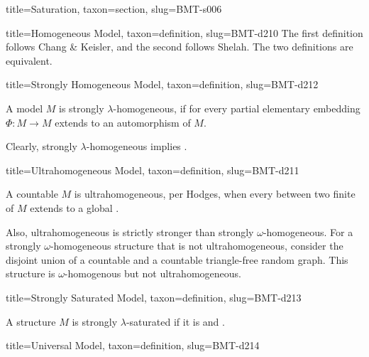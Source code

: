 \documentclass[a4paper]{article}
\begin{document}
\begin{tree}{title={Saturation}, taxon={section}, slug={BMT-s006}}
\begin{tree}{title={Homogeneous Model}, taxon={definition}, slug={BMT-d210}}
    The first definition follows Chang & Keisler, and the second follows Shelah. The two definitions are equivalent.

\end{tree}

\begin{tree}{title={Strongly Homogeneous Model}, taxon={definition}, slug={BMT-d212}}

    A model \(M\) is strongly \(\lambda\)-homogeneous, if for every partial elementary embedding \(\Phi :M \to  M\) extends to an automorphism of \(M\). 

    Clearly, strongly \(\lambda\)-homogeneous implies . 

\end{tree}

\begin{tree}{title={Ultrahomogeneous Model}, taxon={definition}, slug={BMT-d211}}

    A countable  \(M\) is ultrahomogeneous, per Hodges, when every  between two finite  of \(M\) extends to a global .

    Also, ultrahomogeneous is strictly stronger than strongly \(\omega\)-homogeneous. For a strongly \(\omega\)-homogeneous structure that is not ultrahomogeneous, consider the disjoint union of a countable  and a countable triangle-free random graph. This structure is \(\omega\)-homogenous but not ultrahomogeneous.

\end{tree}

\begin{tree}{title={Strongly Saturated Model}, taxon={definition}, slug={BMT-d213}}
{



}\par{
    A structure \(M\) is strongly \(\lambda\)-saturated if it is  and .
}
\end{tree}

\begin{tree}{title={Universal Model}, taxon={definition}, slug={BMT-d214}}


\end{tree}
\end{tree}
\end{document}
